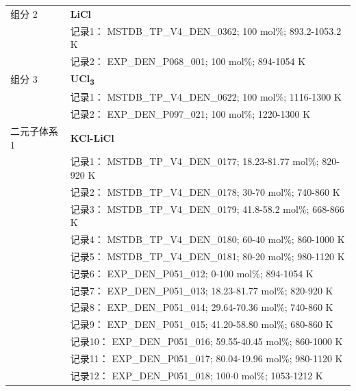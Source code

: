 \documentclass[12pt]{article}
\begin{document}
{\begin{longtable}[]{@{}
  >{\raggedright\arraybackslash}p{}
  >{\raggedright\arraybackslash}p{}@{}}
组分 2  & \textbf{LiCl} \\
 & 记录1： MSTDB\_TP\_V4\_DEN\_0362; 100 mol\%; 893.2-1053.2 K \\
 & 记录2： EXP\_DEN\_P068\_001; 100 mol\%; 894-1054 K  \\

组分 3  & \textbf{UCl\textsubscript{3}} \\
 & 记录1： MSTDB\_TP\_V4\_DEN\_0622; 100 mol\%; 1116-1300 K \\
 & 记录2： EXP\_DEN\_P097\_021; 100 mol\%; 1220-1300 K  \\

二元子体系 1  & \textbf{KCl-LiCl} \\
 & 记录1： MSTDB\_TP\_V4\_DEN\_0177; 18.23-81.77 mol\%; 820-920 K \\
 & 记录2： MSTDB\_TP\_V4\_DEN\_0178; 30-70 mol\%; 740-860 K \\
 & 记录3： MSTDB\_TP\_V4\_DEN\_0179; 41.8-58.2 mol\%; 668-866 K \\
 & 记录4： MSTDB\_TP\_V4\_DEN\_0180; 60-40 mol\%; 860-1000 K \\
 & 记录5： MSTDB\_TP\_V4\_DEN\_0181; 80-20 mol\%; 980-1120 K \\
 & 记录6： EXP\_DEN\_P051\_012; 0-100 mol\%; 894-1054 K \\
 & 记录7： EXP\_DEN\_P051\_013; 18.23-81.77 mol\%; 820-920 K \\
 & 记录8： EXP\_DEN\_P051\_014; 29.64-70.36 mol\%; 740-860 K \\
 & 记录9： EXP\_DEN\_P051\_015; 41.20-58.80 mol\%; 680-860 K \\
 & 记录10： EXP\_DEN\_P051\_016; 59.55-40.45 mol\%; 860-1000 K \\
 & 记录11： EXP\_DEN\_P051\_017; 80.04-19.96 mol\%; 980-1120 K \\
 & 记录12： EXP\_DEN\_P051\_018; 100-0 mol\%; 1053-1212 K  \\


\end{longtable}}
\end{document}

